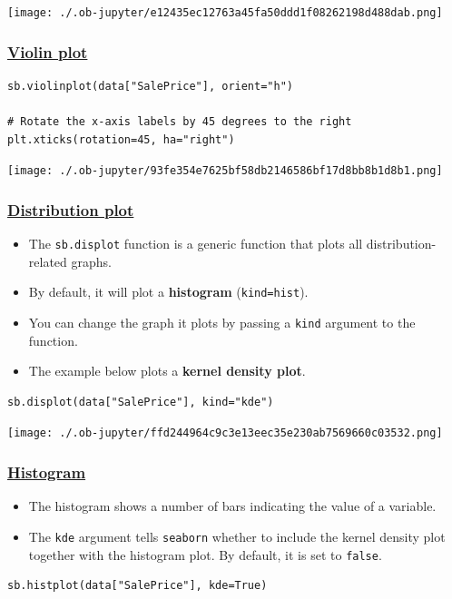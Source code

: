 \documentclass[11pt]{article}
\begin{document}
\begin{center}
\texttt{[image: ./.ob-jupyter/e12435ec12763a45fa50ddd1f08262198d488dab.png]}
\label{orge816ea7}
\end{center}

 \newpage
\subsubsection{\href{https://seaborn.pydata.org/generated/seaborn.violinplot.html}{Violin plot}}
\label{sec:org8d1eecd}
\begin{verbatim}
sb.violinplot(data["SalePrice"], orient="h")

# Rotate the x-axis labels by 45 degrees to the right
plt.xticks(rotation=45, ha="right")
\end{verbatim}

\begin{center}
\texttt{[image: ./.ob-jupyter/93fe354e7625bf58db2146586bf17d8bb8b1d8b1.png]}
\label{org04d7c51}
\end{center}

 \newpage
\subsubsection{\href{https://seaborn.pydata.org/generated/seaborn.displot.html}{Distribution plot}}
\label{sec:orgd4826a3}
\begin{itemize}
\item The \texttt{sb.displot} function is a generic function that plots all distribution-related graphs.
\item By default, it will plot a \textbf{histogram} (\texttt{kind=hist}).
\item You can change the graph it plots by passing a \texttt{kind} argument to the function.
\item The example below plots a \textbf{kernel density plot}.
\end{itemize}
\begin{verbatim}
sb.displot(data["SalePrice"], kind="kde")
\end{verbatim}

\begin{center}
\texttt{[image: ./.ob-jupyter/ffd244964c9c3e13eec35e230ab7569660c03532.png]}
\label{org5971c2a}
\end{center}

 \newpage
\subsubsection{\href{https://seaborn.pydata.org/generated/seaborn.histplot.html}{Histogram}}
\label{sec:org7f7d735}
\begin{itemize}
\item The histogram shows a number of bars indicating the value of a variable.
\item The \texttt{kde} argument tells \texttt{seaborn} whether to include the kernel density plot together with the histogram plot. By default, it is set to \texttt{false}.
\end{itemize}
\begin{verbatim}
sb.histplot(data["SalePrice"], kde=True)
\end{verbatim}
\end{document}
